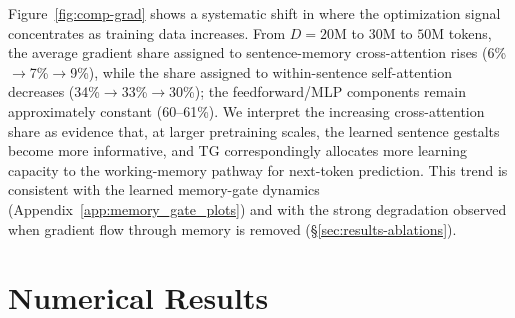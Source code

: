 \documentclass{article}
\begin{document}
Figure~\ref{fig:comp-grad} shows a systematic shift in where the optimization signal concentrates as training data increases.
From $D{=}20$M to $30$M to $50$M tokens, the average gradient share assigned to sentence-memory cross-attention rises
(6\%$\rightarrow$7\%$\rightarrow$9\%), while the share assigned to within-sentence self-attention decreases
(34\%$\rightarrow$33\%$\rightarrow$30\%); the feedforward/MLP components remain  approximately constant
(60--61\%). We interpret the increasing cross-attention share as evidence that, at larger pretraining scales, the learned
sentence gestalts become more informative, and TG correspondingly allocates more learning capacity to the working-memory
pathway for next-token prediction. This trend is consistent with the learned memory-gate dynamics (Appendix~\ref{app:memory_gate_plots})
and with the strong degradation observed when gradient flow through memory is removed (\S\ref{sec:results-ablations}).


\section{Numerical Results}
\end{document}
